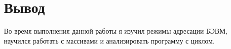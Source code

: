 \section{Вывод}
Во время выполнения данной работы я изучил режимы адресации БЭВМ,
научился работать с массивами и анализировать программу с циклом.